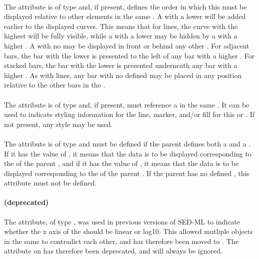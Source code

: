 \begin{blockChanged}
\paragraph*{}
The  attribute is of type  and, if present, defines the order in which this \Curve must be displayed relative to other \Curve elements in the same \Plot.  A \Curve with a lower  will be added earlier to the displayed curves.  This means that for lines, the curve with the highest  will be fully visible, while a \Curve with a lower  may be hidden by a \Curve with a higher .  A \Curve with no  may be displayed in front or behind any other \Curve.  For adjacent bars, the bar with the lower  is presented to the left of any bar with a higher .  For stacked bars, the bar with the lower  is presented underneath any bar with a higher .  As with lines, any bar with no  defined may be placed in any position relative to the other bars in the \Curve.

\paragraph*{}
The  attribute is of type \SIdRef and, if present, must reference a \Style in the same \SedDocument.  It can be used to indicate styling information for the line, marker, and/or fill for this \Curve or \ShadedArea.  If not present, any style may be used.

\paragraph*{}
The  attribute is of type  and must be defined if the parent \Plot defines both a  and a .  If it has the value of , it means that the data is to be displayed corresponding to the  of the parent \Plot, and if it has the value of , it means that the data is to be displayed corresponding to the  of the parent \Plot.  If the parent \Plot has no defined , this attribute must not be defined.

\paragraph*{ (deprecated)}
The  attribute, of type , was used in previous versions of SED-ML to indicate whether the x axis of the \Plot should be linear or log10.  This allowed mutliple \Curve objects in the same \Plot to contradict each other, and has therefore been moved to \Axis.  The  attribute on \Curve has therefore been deprecated, and will always be ignored.

\end{blockChanged}


